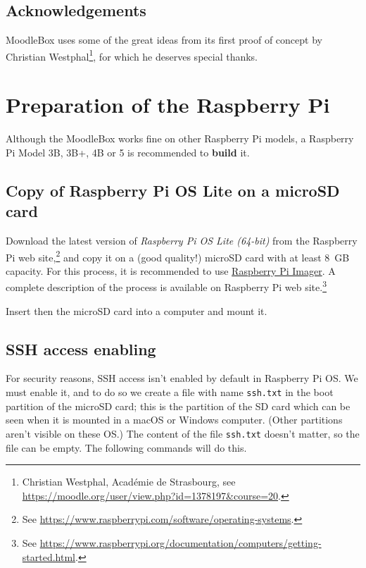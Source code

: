 \documentclass[12pt]{article}
\begin{document}
\subsection{Acknowledgements}

MoodleBox uses some of the great ideas from its first proof of concept by Christian Westphal\footnote{Christian Westphal, Académie de Strasbourg, see \url{https://moodle.org/user/view.php?id=1378197&course=20}.}, for which he deserves special thanks.

\section{Preparation of the Raspberry Pi}

Although the MoodleBox works fine on other Raspberry Pi models, a Raspberry Pi Model 3B, 3B+, 4B or 5 is recommended to \textbf{build} it.

\subsection{Copy of Raspberry Pi OS Lite on a microSD card}

Download the latest version of \emph{Raspberry Pi OS Lite (64-bit)} from the Raspberry Pi web site,\footnote{See \url{https://www.raspberrypi.com/software/operating-systems}.} and copy it on a (good quality!) microSD card with at least 8~GB capacity.
For this process, it is recommended to use \href{https://www.raspberrypi.com/software/}{Raspberry Pi Imager}.
A complete description of the process is available on Raspberry Pi web site.\footnote{See \url{https://www.raspberrypi.org/documentation/computers/getting-started.html}.}

Insert then the microSD card into a computer and mount it.

\subsection{SSH access enabling}

For security reasons, SSH access isn't enabled by default in Raspberry Pi OS.
We must enable it, and to do so we create a file with name \lstinline{ssh.txt} in the boot partition of the microSD card;
this is the partition of the SD card which can be seen when it is mounted in a macOS or Windows computer.
(Other partitions aren't visible on these OS.)
The content of the file \lstinline{ssh.txt} doesn't matter, so the file can be empty.
The following commands will do this.
\end{document}

